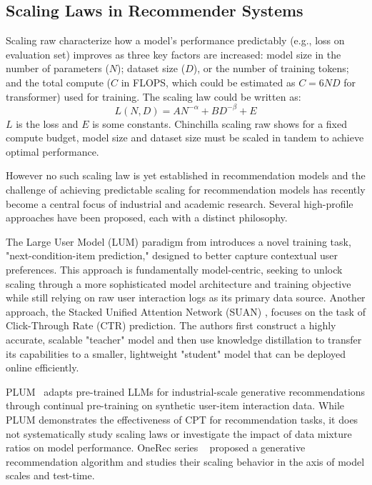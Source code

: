 \documentclass[]{fairmeta}
\begin{document}
\subsection{Scaling Laws in Recommender Systems}
Scaling raw \cite{kaplan2020scalinglawsneurallanguage} characterize how a model's performance predictably (e.g., loss on evaluation set) improves as three key factors are increased: model size in the number of parameters ($N$); dataset size ($D$), or the number of training tokens; and the total compute ($C$ in FLOPS, which could be estimated as $C=6ND$ for transformer) used for training. The scaling law could be written as:
\begin{equation}
    L(N,D)=AN^{-\alpha}+BD^{-\beta}+E
\end{equation}
$L$ is the loss and $E$ is some constants. Chinchilla scaling raw \cite{hoffmann2022training} shows for a fixed compute budget, model size and dataset size must be scaled in tandem to achieve optimal performance. 

However no such scaling law is yet established in recommendation models and the challenge of achieving predictable scaling for recommendation models has recently become a central focus of industrial and academic research. Several high-profile approaches have been proposed, each with a distinct philosophy. %

The Large User Model (LUM) paradigm from \cite{yan2025unlockingscalinglawindustrial} introduces a novel training task, "next-condition-item prediction," designed to better capture contextual user preferences. This approach is fundamentally model-centric, seeking to unlock scaling through a more sophisticated model architecture and training objective while still relying on raw user interaction logs as its primary data source. Another approach, the Stacked Unified Attention Network (SUAN) \cite{Lai_2025}, focuses on the task of Click-Through Rate (CTR) prediction. The authors first construct a highly accurate, scalable "teacher" model and then use knowledge distillation to transfer its capabilities to a smaller, lightweight "student" model that can be deployed online efficiently.

PLUM~\cite{hePLUMAdaptingPretrained2025} adapts pre-trained LLMs for industrial-scale generative recommendations through continual pre-training on synthetic user-item interaction data. While PLUM demonstrates the effectiveness of CPT for recommendation tasks, it does not systematically study scaling laws or investigate the impact of data mixture ratios on model performance. OneRec series ~\cite{zhouOneRecTechnicalReport2025, zhouOneRecV2TechnicalReport2025, liuOneRecThinkInTextReasoning2025} proposed a generative recommendation algorithm and studies their scaling behavior in the axis of model scales and test-time.
\end{document}
